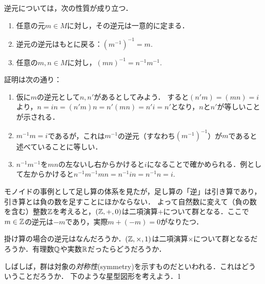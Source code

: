 \documentclass[11pt,a4paper]{jsarticle}
\begin{document}
逆元については，次の性質が成り立つ．
\begin{enumerate}
    \item 任意の元$m \in M$に対し，その逆元は一意的に定まる．
    \item 逆元の逆元はもとに戻る：$(m^{-1})^{-1}=m$.
    \item 任意の$m,n \in M$に対し，$(mn)^{-1}=n^{-1}m^{-1}$.
\end{enumerate}
証明は次の通り：
\begin{enumerate}
    \item 仮に$m$の逆元として$n, n'$があるとしてみよう．
    すると$(n'm)=(mn)=i$より，$n = in = (n'm)n = n'(mn) = n'i = n'$となり，$n$と$n'$が等しいことが示される．
    \item $m^{-1}m=i$であるが，これは$m^{-1}$の逆元（すなわち$(m^{-1})^{-1}$）が$m$であると述べていることに等しい．
    \item $n^{-1}m^{-1}$を$mn$の左ないし右からかけると$i$になることで確かめられる．例として左からかけると$n^{-1}m^{-1}mn = n^{-1} i n = n^{-1}n = i$.
\end{enumerate}


\begin{example}
    モノイドの事例として足し算の体系を見たが，足し算の「逆」は引き算であり，引き算とは負の数を足すことにほかならない．
    よって自然数に変えて（負の数を含む）整数$\mathbb{Z}$を考えると，$(\mathbb{Z}, +, 0)$は二項演算$+$について群となる．ここで$m \in \mathbb{Z}$の逆元は$-m$であり，実際$m + (-m) = 0$がなりたつ．
\end{example}

\begin{exercise}
    掛け算の場合の逆元はなんだろうか．$(\mathbb{Z}, \times, 1)$は二項演算$\times$について群となるだろうか．有理数$\mathbb{Q}$や実数$\mathbb{R}$だったらどうだろうか．
\end{exercise}

 

しばしば，群は対象の\emph{対称性}(symmetry)を示すものだといわれる．これはどういうことだろうか．
下のような星型図形を考えよう．1
\end{document}
